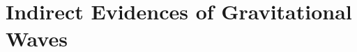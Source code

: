 \documentclass[11pt, a4paper]{article}
\begin{document}
\section{Indirect Evidences of Gravitational Waves}




\printbibliography
\end{document}

